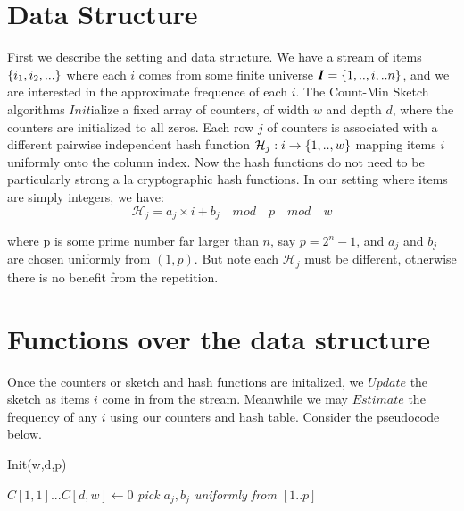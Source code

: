 


\section*{Data Structure}


First we describe the setting and data structure. We have a stream of items $\set{i_1, i_2, ...}$ where each $i$ comes from some finite universe $\pmb{I} = \set{1,..,i,..n}$, and we are interested in the approximate frequence of each $i$. The Count-Min Sketch algorithms $Init$ialize a fixed array of counters, of width $w$ and depth $d$, where the counters are initialized to all zeros. Each row $j$ of counters is associated with a different pairwise independent hash function $\mathcal{H}_j : i \send \set{1,..,w}$ mapping items $i$ uniformly onto the column index. Now the hash functions do not need to be particularly strong a la cryptographic hash functions. In our setting where items are simply integers, we have:
	\[
		\mathcal{H}_j = a_j \times i + b_j \quad mod \quad p \quad mod \quad w
	\]

where p is some prime number far larger than $n$, say $p = 2^n - 1$, and $a_j$ and $b_j$ are chosen uniformly from $(1,p)$. But note each $\mathcal{H}_j$ must be different, otherwise there is no benefit from the repetition.\newline

\section*{Functions over the data structure}

Once the counters or sketch and hash functions are initalized, we $Update$ the sketch as items $i$ come in from the stream. Meanwhile we may $Estimate$ the frequency of any $i$ using our counters and hash table. Consider the pseudocode below. \newline


\begin{algorithm}
\caption{Init(w,d,p)}\label{euclid}
\begin{algorithmic}[1]
	\State $C[1,1]...C[d,w] \gets 0$
		\State \textit{pick $a_j,b_j$ uniformly from $[1..p]$}
	\EndFor
\end{algorithmic}
\end{algorithm}


